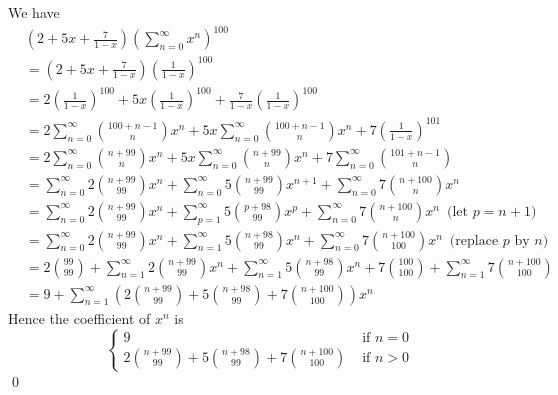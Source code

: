 
We have
\begin{align*}
&\left( 
2 + 5x + \frac{7}{1 - x}
\right)
\left( \sum_{n=0}^\infty x^n \right)^{100}
\\
&= \left( 
2 + 5x + \frac{7}{1 - x}
\right)
\left( \frac{1}{1 - x} \right)^{100}
\\
&=
2\left( \frac{1}{1 - x} \right)^{100}
+ 5x \left( \frac{1}{1 - x} \right)^{100}
+ \frac{7}{1 - x} \left( \frac{1}{1 - x} \right)^{100}
\\
&=
2 \sum_{n=0}^\infty \binom{100 + n - 1}{n} x^n
+ 5x \sum_{n=0}^\infty \binom{100 + n - 1}{n} x^n
+ 7 \left( \frac{1}{1 - x} \right)^{101} 
\\
&=
2 \sum_{n=0}^\infty \binom{n + 99}{n} x^n
+ 5x \sum_{n=0}^\infty \binom{n + 99}{n} x^n
+ 7 \sum_{n=0}^\infty \binom{101 + n - 1}{n}
\\
&=
\sum_{n=0}^\infty 2 \binom{n + 99}{99} x^n
+ \sum_{n=0}^\infty 5 \binom{n + 99}{99} x^{n+1}
+ \sum_{n=0}^\infty 7 \binom{n + 100}{n} x^n
\\
&=
\sum_{n=0}^\infty 2 \binom{n + 99}{99} x^n
+ \sum_{p=1}^\infty 5 \binom{p + 98}{99} x^{p}
+ \sum_{n=0}^\infty 7          \binom{n + 100}{n} x^n  \,\,\, \text{(let $p = n + 1$)}
\\
&=
\sum_{n=0}^\infty 2\binom{n + 99}{99} x^n
+ \sum_{n=1}^\infty 5 \binom{n + 98}{99} x^{n}  
+ \sum_{n=0}^\infty 7 \binom{n + 100}{100} x^n \,\,\,\text{(replace $p$ by $n$)}
\\
&=
2 \binom{99}{99} + \sum_{n=1}^\infty 2\binom{n + 99}{99} x^n
+ \sum_{n=1}^\infty 5\binom{n + 98}{99} x^{n} 
+ 7\binom{100}{100}  + \sum_{n=1}^\infty 7 \binom{n + 100}{100}  
\\
&=
9 +
\sum_{n=1}^\infty
\left( 2\binom{n + 99}{99} 
+  5\binom{n + 98}{99} 
+ 7 \binom{n + 100}{100}
\right) x^n
\end{align*}
Hence the coefficient of $x^n$ is
\[
\begin{cases}
9 & \text{ if } n = 0 \\
\displaystyle 2\binom{n + 99}{99} 
+  5\binom{n + 98}{99} 
+ 7 \binom{n + 100}{100} & \text{ if } n > 0
\end{cases}
\]
\qed
